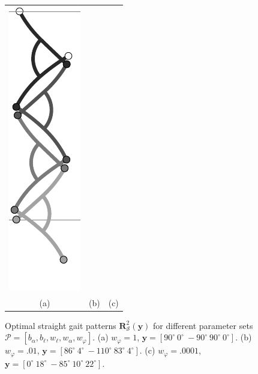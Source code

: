 \documentclass[10pt,a4paper]{article}
\begin{document}
\begin{figure}
\begin{center}
\begin{tabular}{ccc}
\includegraphics[scale=1]{../Pics/py/straight_f_ori_0001.pdf} \\
(a) & (b) & (c) \\
\end{tabular}
\caption{Optimal straight gait patterns $\bm{R}_\mathcal{S}^2(\bm{y})$ for different parameter sets $\mathcal{P} = [b_\alpha, b_\ell, w_\ell, w_\alpha, w_\varphi]$.
(a) $w_\varphi = 1$, $\bm{y}=[90^\circ~0^\circ~-90^\circ~90^\circ~0^\circ]$.
(b) $w_\varphi = .01$, $\bm{y}=[86^\circ~4^\circ~-110^\circ~83^\circ~4^\circ]$.
(c) $w_\varphi = .0001$, $\bm{y}=[0^\circ~18^\circ~-85^\circ~10^\circ~22^\circ]$.}
\label{fig:opt_straight_gait}
\end{center}
\end{figure}
\end{document}
